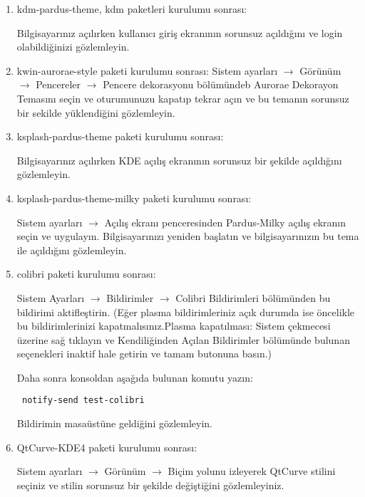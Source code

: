 \documentclass[a4paper,10pt]{article}
\begin{document}
\begin{enumerate}

\item  kdm-pardus-theme, kdm paketleri kurulumu sonrası:

Bilgisayarınız açılırken kullanıcı giriş ekranının sorunsuz açıldığını ve login olabildiğinizi gözlemleyin.

\item kwin-aurorae-style paketi kurulumu sonrası:
Sistem ayarları $\rightarrow$ Görünüm $\rightarrow$ Pencereler $\rightarrow$ Pencere dekorasyonu bölümündeb Aurorae Dekorayon Temasını seçin ve oturumunuzu kapatıp tekrar açın ve bu temanın sorunsuz bir sekilde yüklendiğini gözlemleyin.

\item  ksplash-pardus-theme paketi kurulumu sonrası:

Bilgisayarınız açılırken KDE açılış ekranının sorunsuz bir şekilde açıldığını gözlemleyin.

\item  ksplash-pardus-theme-milky paketi kurulumu sonrası:

Sistem ayarları $\rightarrow$ Açılış ekranı penceresinden Pardus-Milky açılış ekranın seçin ve uygulayın. Bilgisayarınızı yeniden başlatın ve bilgisayarınızın bu tema ile açıldığını gözlemleyin.

\item colibri paketi kurulumu sonrası:

Sistem Ayarları $\rightarrow$ Bildirimler $\rightarrow$ Colibri Bildirimleri bölümünden bu bildirimi aktifleştirin. (Eğer plasma bildirimleriniz açık durumda ise öncelikle bu bildirimlerinizi kapatmalısınız.Plasma kapatılması: Sistem çekmecesi üzerine sağ tıklayın ve Kendiliğinden Açılan Bildirimler bölümünde bulunan seçenekleri inaktif hale getirin ve tamam butonuna basın.)

Daha sonra konsoldan aşağıda bulunan komutu yazın:

\begin{verbatim}
 notify-send test-colibri 
\end{verbatim}

 Bildirimin masaüstüne geldiğini gözlemleyin.

 \item  QtCurve-KDE4 paketi kurulumu sonrası:

Sistem ayarları $\rightarrow$ Görünüm $\rightarrow$ Biçim yolunu izleyerek QtCurve stilini seçiniz ve stilin sorunsuz bir şekilde değiştiğini gözlemleyiniz.


\end{enumerate}
\end{document}
